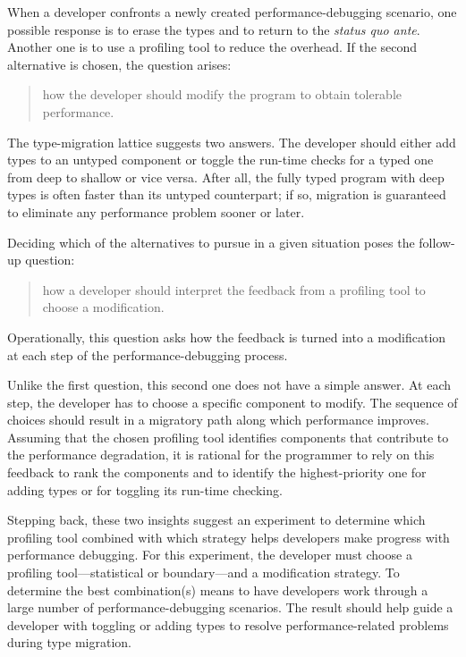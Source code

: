 
When a developer confronts a newly created performance-debugging scenario, one
possible response is to erase the types and to return to the {\em status quo
ante\/}.  Another one is to use a profiling tool to reduce the overhead. If the
second alternative is chosen, the question arises:
\begin{quote} \em

 how the developer should modify the program to obtain tolerable performance.
 
\end{quote}   
The type-migration lattice suggests two answers.  The developer should either
add types to an untyped component or toggle the run-time checks for a typed one
from deep to shallow or vice versa.  After all, the fully typed program with
deep types is often faster than its untyped
counterpart; if so, migration is guaranteed to eliminate any performance
problem sooner or later.

Deciding which of the alternatives to pursue in a given situation poses the
follow-up question:
\begin{quote} \em

how a developer should interpret the feedback from a profiling tool to
choose a modification.

\end{quote}   
Operationally, this question asks how the feedback is turned into a
modification at each step of the performance-debugging process.

Unlike the first question, this second one does not have a simple answer.  At
each step, the developer has to choose a specific component to modify.  The
sequence of choices should result in a migratory path along which performance
improves. Assuming that the chosen profiling tool identifies components that
contribute to the performance degradation, it is rational for the programmer to
rely on this feedback to rank the components and to identify the
highest-priority one for adding types or for toggling its run-time checking.

Stepping back, these two insights suggest an experiment to determine which
profiling tool combined with which strategy helps developers make progress with
performance debugging. For this experiment, the developer must choose a
profiling tool---statistical or boundary---and a modification strategy.
To determine the best combination(s) means to have developers work through a
large number of performance-debugging scenarios. The result should help guide a
developer with toggling or adding types to resolve performance-related
problems during type migration.

